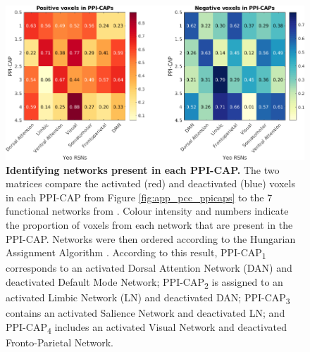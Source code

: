 \begin{figure}[h]
\centering
\includegraphics[width=1\textwidth]{images/Appendix/PCCK4_assigment_YeoRSN.png}
\caption{\textbf{Identifying networks present in each PPI-CAP.} The two matrices compare the activated (red) and deactivated (blue) voxels in each PPI-CAP from Figure \ref{fig:app_pcc_ppicaps} to the 7 functional networks from \citet{Yeo2011}. Colour intensity and numbers indicate the proportion of voxels from each network that are present in the PPI-CAP. Networks were then ordered according to the Hungarian Assignment Algorithm \citep{Munkres1957}. According to this result, PPI-CAP\textsubscript{1} corresponds to an activated Dorsal Attention Network (DAN) and deactivated Default Mode Network;  PPI-CAP\textsubscript{2} is assigned to an activated Limbic Network (LN) and deactivated DAN; PPI-CAP\textsubscript{3} contains an activated Salience Network and deactivated LN; and PPI-CAP\textsubscript{4} includes an activated Visual Network and deactivated Fronto-Parietal Network. }
\label{fig:app_pcc_munkres}
\end{figure}






